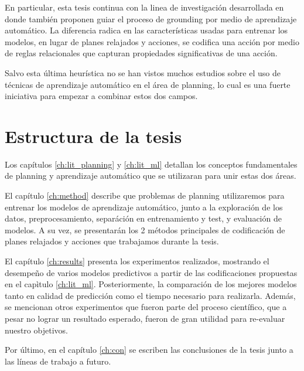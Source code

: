 En particular, esta tesis continua con la linea de investigación desarrollada en
\citep{Gnad_Torralba_Dominguez_Areces_Bustos_2019} donde también proponen guiar
el proceso de grounding por medio de aprendizaje automático. La diferencia
radica en las características usadas para entrenar los modelos, en lugar de
planes relajados y acciones, se codifica una acción por medio de reglas
relacionales que capturan propiedades significativas de una acción.

Salvo esta última heurística no se han vistos muchos estudios sobre el uso de
técnicas de aprendizaje automático en el área de planning, lo cual es una fuerte
iniciativa para empezar a combinar estos dos campos.

\section{Estructura de la tesis}

Los capítulos \ref{ch:lit_planning} y \ref{ch:lit_ml} detallan los conceptos
fundamentales de planning y aprendizaje automático que se utilizaran para unir
estas dos áreas.

El capítulo \ref{ch:method} describe que problemas de planning utilizaremos para
entrenar los modelos de aprendizaje automático, junto a la exploración de los
datos, preprocesamiento, separáción en entrenamiento y test, y evaluación de
modelos. A su vez, se presentarán los 2 métodos principales de codificación de
planes relajados y acciones que trabajamos durante la tesis.

El capítulo \ref{ch:results} presenta los experimentos realizados, mostrando el
desempeño de varios modelos predictivos a partir de las codificaciones
propuestas en el capìtulo \ref{ch:lit_ml}. Posteriormente, la comparación de los
mejores modelos tanto en calidad de predicción como el tiempo necesario para
realizarla. Además, se mencionan otros experimentos que fueron parte del proceso
científico, que a pesar no lograr un resultado esperado, fueron de gran
utilidad para re-evaluar nuestro objetivos.

Por último, en el capítulo \ref{ch:con} se escriben las conclusiones de la tesis
junto a las líneas de trabajo a futuro.
